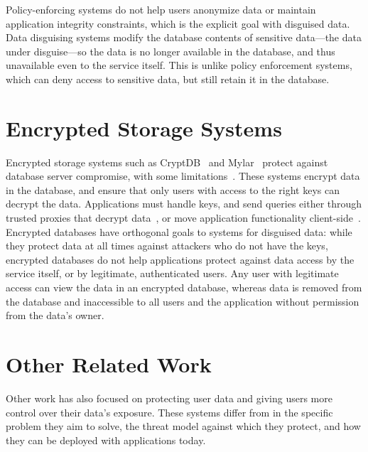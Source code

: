 %
Policy-enforcing systems do not help users anonymize data or maintain
application integrity constraints, which is the explicit goal with disguised
data.
%
Data disguising systems modify the database contents of sensitive
data---the data under disguise---so the data is no longer available in the
database, and thus unavailable even to the service itself. This is unlike policy
enforcement systems, which can deny access to sensitive data, but still
retain it in the database.
%

\section{Encrypted Storage Systems}
Encrypted storage systems such as CryptDB~\cite{cryptdb} and
Mylar~\cite{mylar} protect against database server compromise, with some
limitations~\cite{grubbs}.
%
These systems encrypt data in the database, and
ensure that only users with access to the right keys can decrypt the data.
%
Applications must handle keys, and send queries
either through trusted proxies that decrypt data~\cite{cryptdb}, or move
application functionality client-side~\cite{mylar}.
%
Encrypted databases have orthogonal goals to systems for disguised data: while
they protect data at all times against attackers who do not have the keys,
encrypted databases do not help applications protect against data access by
the service itself, or by legitimate, authenticated users. 
%
Any user with legitimate access can view the data in an encrypted database,
whereas \xxed data is removed from the database and inaccessible to all users
and the application without permission from the data's owner.
%
%

\section{Other Related Work} 
Other work has also focused on protecting user data and giving users more
control over their data's exposure. These systems differ from \sys in
the specific problem they aim to solve, the threat model against which they
protect, and how they can be deployed with applications today.

